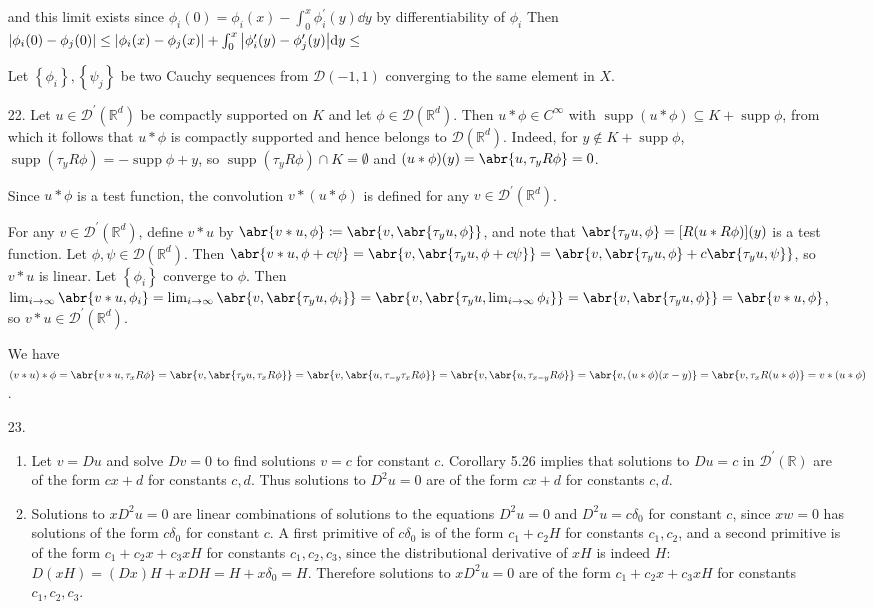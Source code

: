 \documentclass[11pt,leqno]{article}
\theoremstyle{plain}
\theoremstyle{definition}
\numberwithin{equation}{section}
\numberwithin{lem}{section}
\newcommand{\cbr}[1]{\left\{#1\right\}}
\DeclareMathOperator{\supp}{supp}
\begin{document}
\begin{enumerate}
    and this limit exists since $\phi_i(0) = \phi_i(x) - \int_0^x\phi_i^\prime(y)\dd y$ by differentiability of $\phi_i$ Then $\abs{\phi_i(0)-\phi_j(0)} \leq \abs{\phi_i(x)-\phi_j(x)} + \int_0^x\big|\phi_i^\prime(y)-\phi_j^\prime(y)\big|\dd y \leq $
    
    Let $\cbr{\phi_i},\cbr{\psi_j}$ be two Cauchy sequences from $\mathcal D(-1,1)$ converging to the same element in $X$. 
    \item[22.] Let $u\in \mathcal D^\prime(\mathbb R^d)$ be compactly supported on $K$ and let $\phi\in\mathcal D(\mathbb R^d)$. Then $u\ast\phi\in C^\infty$ with $\supp(u\ast\phi)\subseteq K+\supp\phi$, from which it follows that $u\ast\phi$ is compactly supported and hence belongs to $\mathcal D(\mathbb R^d)$. Indeed, for $y\not\in K+\supp\phi$, $\supp(\tau_yR\phi) = -\supp\phi + y$, so $\supp(\tau_yR\phi)\cap K = \emptyset$ and $(u\ast\phi)(y) = \abr{u,\tau_yR\phi} = 0$.
    
    Since $u\ast \phi$ is a test function, the convolution $v\ast(u\ast \phi)$ is defined for any $v\in\mathcal D^\prime(\mathbb R^d)$.

    For any $v\in\mathcal D^\prime(\mathbb R^d)$, define $v\ast u$ by $\abr{v\ast u,\phi}\coloneqq \abr{v,\abr{\tau_yu,\phi}}$, and note that $\abr{\tau_yu,\phi} = [R(u\ast R\phi)](y)$ is a test function. Let $\phi,\psi\in\mathcal D(\mathbb R^d)$. Then $\abr{v\ast u,\phi+c\psi} = \abr{v,\abr{\tau_yu,\phi+c\psi}} = \abr{v,\abr{\tau_yu,\phi} + c\abr{\tau_yu,\psi}}$, so $v\ast u$ is linear. Let $\cbr{\phi_i}$ converge to $\phi$. Then $\lim_{i\to\infty}\abr{v\ast u,\phi_i} = \lim_{i\to\infty}\abr{v,\abr{\tau_yu,\phi_i}} = \abr{v,\abr{\tau_yu,\lim_{i\to\infty} \phi_i}} = \abr{v,\abr{\tau_yu,\phi}} = \abr{v\ast u,\phi}$, so $v\ast u\in\mathcal D^\prime(\mathbb R^d)$.
    
    We have $(v\ast u)\ast \phi = \abr{v\ast u,\tau_xR\phi} = \abr{v,\abr{\tau_yu,\tau_xR\phi}} = \abr{v,\abr{u,\tau_{-y}\tau_xR\phi}} = \abr{v,\abr{u,\tau_{x-y}R\phi}} = \abr{v,(u\ast\phi)(x-y)} = \abr{v,\tau_xR(u\ast\phi)} = v\ast(u\ast \phi)$.
    \item[23.] \begin{enumerate}
      \item Let $v = Du$ and solve $Dv = 0$ to find solutions $v = c$ for constant $c$. Corollary 5.26 implies that solutions to $Du = c$ in $\mathcal D^\prime(\mathbb R)$ are of the form $cx+d$ for constants $c,d$. Thus solutions to $D^2u = 0$ are of the form $cx+d$ for constants $c,d$.
      \item Solutions to $xD^2u = 0$ are linear combinations of solutions to the equations $D^2u = 0$ and $D^2u = c\delta_0$ for constant $c$, since $xw = 0$ has solutions of the form $c\delta_0$ for constant $c$. A first primitive of $c\delta_0$ is of the form $c_1 + c_2H$ for constants $c_1,c_2$, and a second primitive is of the form $c_1 + c_2x + c_3xH$ for constants $c_1,c_2,c_3$, since the distributional derivative of $xH$ is indeed $H$: $D(xH) = (Dx)H + xDH = H + x\delta_0 = H$. Therefore solutions to $xD^2u = 0$ are of the form $c_1+c_2x+c_3xH$ for constants $c_1,c_2,c_3$.
    \end{enumerate}
\end{enumerate}
\end{document}
